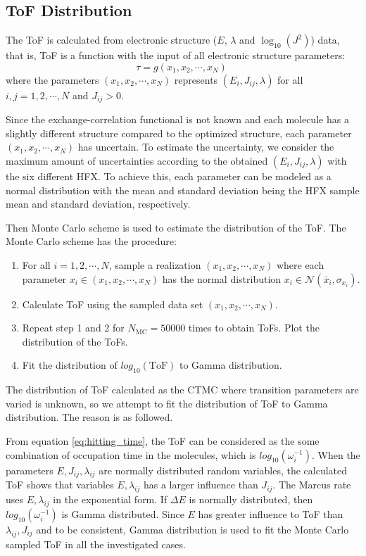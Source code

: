 \documentclass[letterpaper,12pt]{article}
\begin{document}
\subsection{ToF Distribution}
The ToF is calculated from electronic structure ($E$, $\lambda$ and $\log_{10}(J^2)$) data, that is, ToF is a function with the input of all electronic structure parameters:
\begin{equation}
    \tau = g(x_1,x_2,\cdots, x_N) \; 
\end{equation}
where the parameters $(x_1,x_2,\cdots, x_N)$ represents $(E_i, J_{ij}, \lambda)$ for all $i,j=1,2,\cdots,N$ and $J_{ij}>0$. 

Since the exchange-correlation functional is not known and each molecule has a slightly different structure compared to the optimized structure, each parameter $(x_1,x_2,\cdots, x_N)$ has uncertain. 
To estimate the uncertainty, we consider the maximum amount of uncertainties according to the obtained $(E_i, J_{ij}, \lambda)$ with the six different HFX.
To achieve this, each parameter can be modeled as a normal distribution with the mean and standard deviation being the HFX sample mean and standard deviation, respectively.

Then Monte Carlo scheme is used to estimate the distribution of the ToF. The Monte Carlo scheme has the procedure:
\begin{enumerate}
\item For all $i=1,2,\cdots, N$, sample a realization $(x_1,x_2,\cdots, x_N)$ where each parameter $x_i \in (x_1,x_2,\cdots, x_N)$ has the normal distribution $x_i \in \mathcal{N}(\bar{x}_i, \sigma_{x_i})$. 
\item Calculate ToF using the sampled data set $(x_1,x_2,\cdots, x_N)$. 
\item Repeat step 1 and 2 for $N_\text{MC} = 50000$ times to obtain ToFs. Plot the distribution of the ToFs.
\item Fit the distribution of $log_{10}(\text{ToF})$ to Gamma distribution.
\end{enumerate}

The distribution of ToF calculated as the CTMC where transition parameters are varied is unknown, so we attempt to fit the distribution of ToF to Gamma distribution. The reason is as followed.

From equation \ref{eq:hitting_time}, the ToF can be considered as the some combination of occupation time in the molecules, which is $log_{10}(\omega_{i}^{-1})$. 
When the parameters $E, J_{ij}, \lambda_{ij}$ are normally distributed random variables, the calculated ToF shows that variables $E,\lambda_{ij}$ has a larger influence than $J_{ij}$. 
The Marcus rate uses $E,\lambda_{ij}$ in the exponential form. If $\Delta E$ is normally distributed, then $log_{10}(\omega_{i}^{-1})$ is Gamma distributed. 
Since $E$ has greater influence to ToF than $\lambda_{ij}, J_{ij}$ and to be consistent, Gamma distribution is used to fit the Monte Carlo sampled ToF in all the investigated cases.
\end{document}
